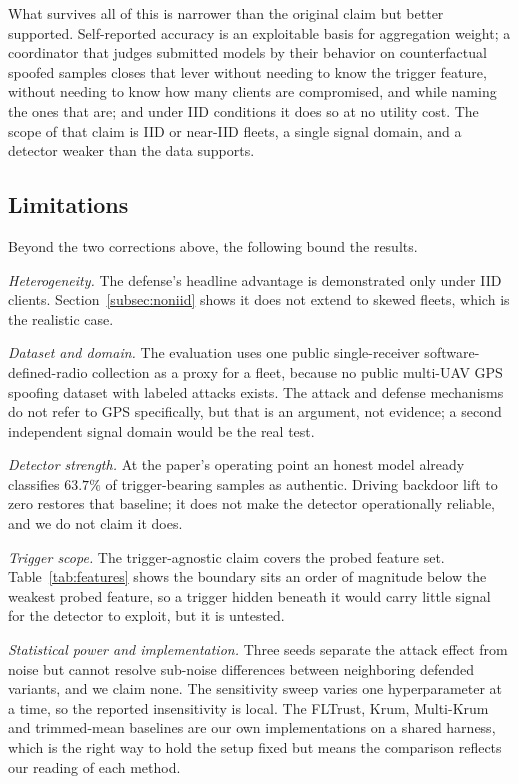 \documentclass[journal]{IEEEtran}
\begin{document}
What survives all of this is narrower than the original claim but better supported. Self-reported accuracy is an exploitable basis for aggregation weight; a coordinator that judges submitted models by their behavior on counterfactual spoofed samples closes that lever without needing to know the trigger feature, without needing to know how many clients are compromised, and while naming the ones that are; and under IID conditions it does so at no utility cost. The scope of that claim is IID or near-IID fleets, a single signal domain, and a detector weaker than the data supports.

\subsection*{Limitations}
Beyond the two corrections above, the following bound the results.

\textit{Heterogeneity.} The defense's headline advantage is demonstrated only under IID clients. Section~\ref{subsec:noniid} shows it does not extend to skewed fleets, which is the realistic case.

\textit{Dataset and domain.} The evaluation uses one public single-receiver software-defined-radio collection as a proxy for a fleet, because no public multi-UAV GPS spoofing dataset with labeled attacks exists. The attack and defense mechanisms do not refer to GPS specifically, but that is an argument, not evidence; a second independent signal domain would be the real test.

\textit{Detector strength.} At the paper's operating point an honest model already classifies $63.7\%$ of trigger-bearing samples as authentic. Driving backdoor lift to zero restores that baseline; it does not make the detector operationally reliable, and we do not claim it does.

\textit{Trigger scope.} The trigger-agnostic claim covers the probed feature set. Table~\ref{tab:features} shows the boundary sits an order of magnitude below the weakest probed feature, so a trigger hidden beneath it would carry little signal for the detector to exploit, but it is untested.

\textit{Statistical power and implementation.} Three seeds separate the attack effect from noise but cannot resolve sub-noise differences between neighboring defended variants, and we claim none. The sensitivity sweep varies one hyperparameter at a time, so the reported insensitivity is local. The FLTrust, Krum, Multi-Krum and trimmed-mean baselines are our own implementations on a shared harness, which is the right way to hold the setup fixed but means the comparison reflects our reading of each method.
\end{document}
